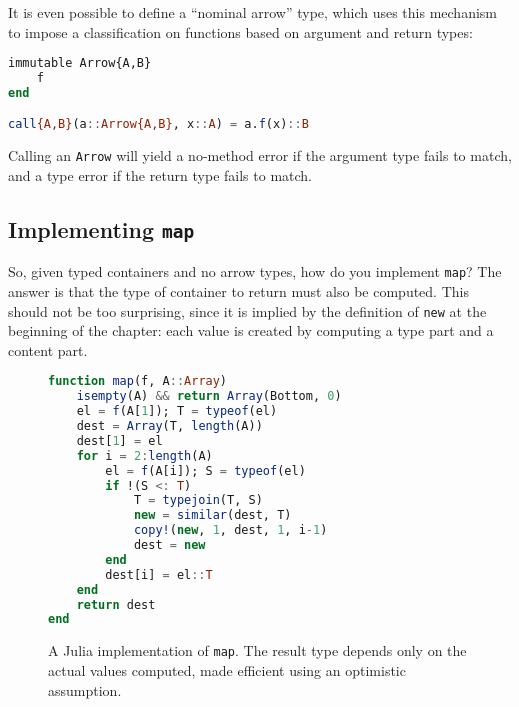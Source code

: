 It is even possible to define a ``nominal arrow'' type, which uses this
mechanism to impose a classification on functions based on argument and
return types:

\begin{samepage}
\begin{singlespace}
\begin{lstlisting}[language=julia]
immutable Arrow{A,B}
    f
end

call{A,B}(a::Arrow{A,B}, x::A) = a.f(x)::B
\end{lstlisting}
\end{singlespace}
\end{samepage}

\noindent
Calling an \texttt{Arrow} will yield a no-method error if the argument
type fails to match, and a type error if the return type fails to
match.





\subsection{Implementing \texttt{map}}

So, given typed containers and no arrow types, how do you implement
\texttt{map}? The answer is that the type of container to return must
also be computed. This should not be too surprising, since it is implied by
the definition of \texttt{new} at the beginning of the chapter: each
value is created by computing a type part and a content part.

\begin{singlespace}
\begin{figure}
\begin{lstlisting}[language=julia]
function map(f, A::Array)
    isempty(A) && return Array(Bottom, 0)
    el = f(A[1]); T = typeof(el)
    dest = Array(T, length(A))
    dest[1] = el
    for i = 2:length(A)
        el = f(A[i]); S = typeof(el)
        if !(S <: T)
            T = typejoin(T, S)
            new = similar(dest, T)
            copy!(new, 1, dest, 1, i-1)
            dest = new
        end
        dest[i] = el::T
    end
    return dest
end
\end{lstlisting}
  \caption[An implementation of \texttt{map}]{
    A Julia implementation of \texttt{map}.
    The result type depends only on the actual values computed, made
    efficient using an optimistic assumption.
  }
  \label{fig:mapimpl}
\end{figure}
\end{singlespace}

